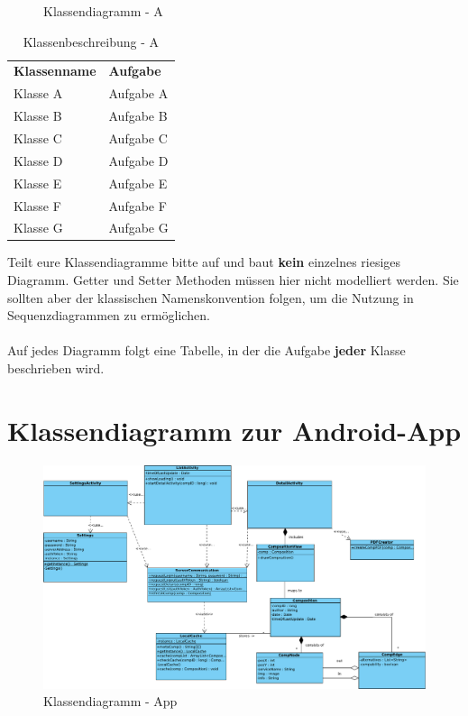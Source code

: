 \begin{figure}[h]
	\centering
	\caption{Klassendiagramm - A}
	\label{fig:klassendiagramm-a}
\end{figure}

\begin{table}[h]
	\centering
	\begin{tabularx}{\textwidth}{X X}
		\rowcolor[HTML]{C0C0C0} 
		\textbf{Klassenname} & \textbf{Aufgabe} \\
		Klasse A & Aufgabe A \\
		\rowcolor[HTML]{E7E7E7} 
		Klasse B & Aufgabe B \\
		Klasse C & Aufgabe C \\
		\rowcolor[HTML]{E7E7E7} 
		Klasse D & Aufgabe D \\
		Klasse E & Aufgabe E \\
		\rowcolor[HTML]{E7E7E7} 
		Klasse F & Aufgabe F \\
		Klasse G & Aufgabe G
	\end{tabularx}
	\caption{Klassenbeschreibung - A}
	\label{table:klassenbeschreibung-a}
\end{table}

\begin{tcolorbox}
Teilt eure Klassendiagramme bitte auf und baut \textbf{kein} einzelnes riesiges Diagramm.
Getter und Setter Methoden müssen hier nicht modelliert werden.
Sie sollten aber der klassischen Namenskonvention folgen, um die Nutzung in Sequenzdiagrammen zu ermöglichen.
\\\\
Auf jedes Diagramm folgt eine Tabelle, in der die Aufgabe \textbf{jeder} Klasse beschrieben wird.
\end{tcolorbox}

\section*{Klassendiagramm zur Android-App}

\begin{figure}[h]
	\centering
	\includegraphics[width=\textwidth]{Klassendiagramm_App/Class_Diagram1}
	\caption{Klassendiagramm - App}
	\label{fig:klassendiagramm-a}
\end{figure}

